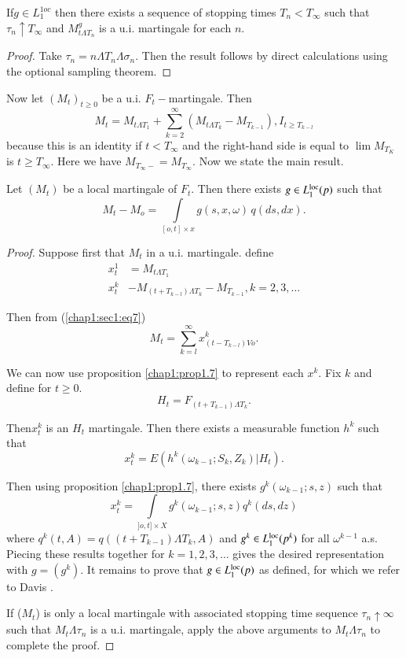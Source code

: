 \begin{prop}%
  If\pageoriginale  $g \in  L^{1oc}_{1}$ then there exists a
  sequence of stopping times $T_n < T_{\infty}$ such that $\tau_n
  \uparrow T_{\infty}$ and  $M^g_{t \Lambda T_n}$ is a 
  u.i. martingale for each $n$. 
\end{prop}

\begin{proof}
  Take $\tau_n = n \Lambda T_n \Lambda \sigma_n$. Then the result
  follows by direct calculations using the optional sampling theorem. 
\end{proof}

Now let $(M_t)_{t \geq 0 }$ be a u.i. $F_t-$martingale. Then 
\begin{equation*}
  M_t = M_{t \Lambda T_1 } +\sum^\infty_{k=2} (M_{t \Lambda T_k} -
  M_{T_{k-1}}), I_{t \geq T_{k-l}}  \tag{7}\label{chap1:sec1:eq7} 
\end{equation*}
because this is an identity if $t < T_\infty $ and the right-hand side
is equal to $\lim M_{T_K} $ is $t \geq T_\infty $. Here we have
$M_{T_\infty -} = M_{T_\infty}$. Now we state the main result.  


\begin{theorem}%
  Let  $(M_t)$ be a local martingale of $F_t$.  Then there exists $g
  \in  L^{\operatorname{loc}}_1 (p)$ such that 
  $$
  M_t - M_o =\int\limits_{[o,t]\times x} g(s,x,\omega)\, q(ds,dx).
    $$
\end{theorem}

\begin{proof}
  Suppose first that $M_t$ in a u.i. martingale. define
  \begin{align*}
    x^1_t & = M_{t \Lambda T_1} \\
    x^k_t & - M_{(t + T_{k-l}) \Lambda T_k} - M_{T_{k-1}}, k = 2,3, \ldots
  \end{align*}

  Then from (\ref{chap1:sec1:eq7})
  $$
  M_t = \sum^\infty_{k=l} x^k_{(t - T_{k-l}) V o}.
  $$

We can now use proposition \ref{chap1:prop1.7} to represent each
$x^k$. Fix $k$ and define for $t \ge 0$. 
$$
H_t = F_{(t + T_{k-1}) \Lambda T_k}.
$$

Then\pageoriginale $x^k_t$ is an $H_t$ martingale. Then there exists a
measurable function $h^k$ such that  
$$
x^k_t = E(h^k (\omega _{k-1}; S_k, Z_k) | H_t).
$$

Then using proposition \ref{chap1:prop1.7}, there exists $g^k(\omega
_{k-1}; s,z)$ such that  
$$
x^k_t = \int \limits_{]o, t ] \times X}g^k(\omega _{k-1}; s,z)q^k(ds,
    dz)  
$$ 
where $q^k(t,A) = q((t + T_{k-1}) \Lambda T_k, A)$ and $g^k
\in  L^{\operatorname{loc}}_1 (p^k)$ for all $\omega^{k-1}$ a.s. Piecing these
results together for $k = 1,2,3,\ldots$ gives the desired
representation with $g = (g^k)$. It remains to prove that $g
\in  L^{\operatorname{loc}}_1(p)$ as defined, for which we refer to Davis \cite{key6}. 

If ($M_t$) is only a local martingale with associated stopping time
sequence $\tau_n \uparrow \infty$ such that $M_t \Lambda \tau_n$ is a
u.i. martingale, apply the above arguments to $M_t \Lambda \tau_n$ to
complete the proof. 
\end{proof}


